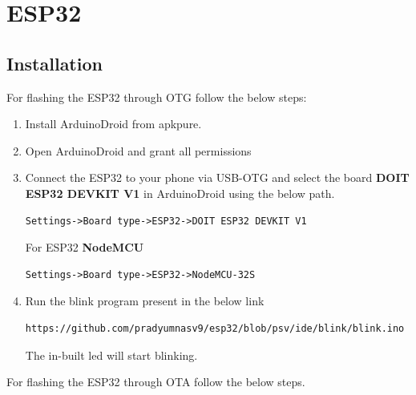 \documentclass[journal]{IEEEtran}
\begin{document}

\onecolumn


\newpage
\onecolumn

\section{ESP32}
\subsection{Installation}
For flashing the ESP32 through OTG follow the below steps:
\begin{enumerate}
	\item Install ArduinoDroid from apkpure.
	\item Open ArduinoDroid and grant all permissions
	\item Connect the ESP32 to your phone via USB-OTG and select the board \textbf{DOIT ESP32 DEVKIT V1} in ArduinoDroid using the below path.
	\begin{lstlisting}
Settings->Board type->ESP32->DOIT ESP32 DEVKIT V1
	\end{lstlisting}
	For ESP32 \textbf{NodeMCU}
	\begin{lstlisting}
Settings->Board type->ESP32->NodeMCU-32S
	\end{lstlisting}
	\item Run the blink program present in the below link
	\begin{lstlisting}
https://github.com/pradyumnasv9/esp32/blob/psv/ide/blink/blink.ino
	\end{lstlisting}
	The in-built led will start blinking.\\
\end{enumerate}
For flashing the ESP32 through OTA follow the below steps. 
\end{document}
